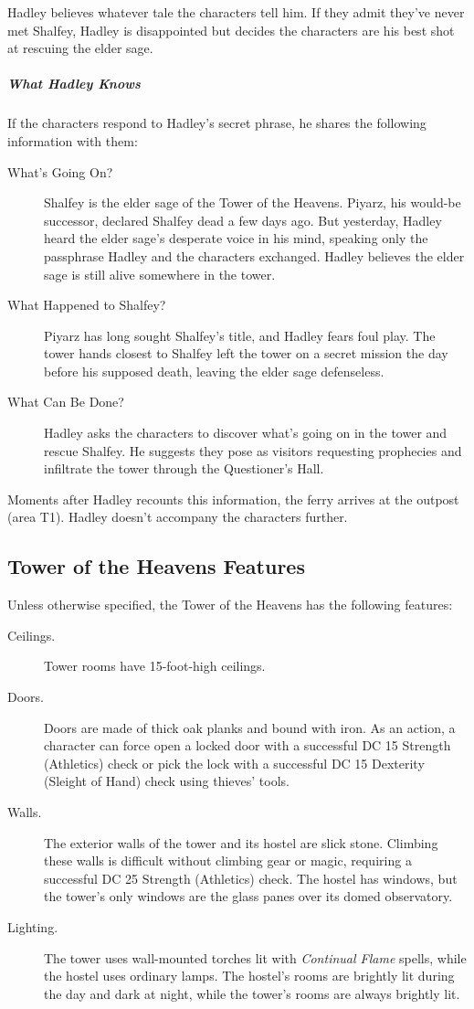 \documentclass[10pt,a4paper,twoside,bg=print,twocolumn,openany,nodeprecatedcode]{dndbook}
\begin{document}
Hadley believes whatever tale the characters tell him. If they admit they've never met Shalfey, Hadley is disappointed but decides the characters are his best shot at rescuing the elder sage.

\subparagraph{What Hadley Knows}
If the characters respond to Hadley's secret phrase, he shares the following information with them:


\begin{description}
\item[What's Going On?]
Shalfey is the elder sage of the Tower of the Heavens. Piyarz, his would-be successor, declared Shalfey dead a few days ago. But yesterday, Hadley heard the elder sage's desperate voice in his mind, speaking only the passphrase Hadley and the characters exchanged. Hadley believes the elder sage is still alive somewhere in the tower.
\item[What Happened to Shalfey?]
Piyarz has long sought Shalfey's title, and Hadley fears foul play. The tower hands closest to Shalfey left the tower on a secret mission the day before his supposed death, leaving the elder sage defenseless.
\item[What Can Be Done?]
Hadley asks the characters to discover what's going on in the tower and rescue Shalfey. He suggests they pose as visitors requesting prophecies and infiltrate the tower through the Questioner's Hall.
\end{description}

Moments after Hadley recounts this information, the ferry arrives at the outpost (area T1). Hadley doesn't accompany the characters further.

\subsection{Tower of the Heavens Features}
Unless otherwise specified, the Tower of the Heavens has the following features:


\begin{description}
\item[Ceilings.]
Tower rooms have 15-foot-high ceilings.
\item[Doors.]
Doors are made of thick oak planks and bound with iron. As an action, a character can force open a locked door with a successful DC 15 Strength (Athletics) check or pick the lock with a successful DC 15 Dexterity (Sleight of Hand) check using thieves' tools.
\item[Walls.]
The exterior walls of the tower and its hostel are slick stone. Climbing these walls is difficult without climbing gear or magic, requiring a successful DC 25 Strength (Athletics) check. The hostel has windows, but the tower's only windows are the glass panes over its domed observatory.
\item[Lighting.]
The tower uses wall-mounted torches lit with \textit{Continual Flame} spells, while the hostel uses ordinary lamps. The hostel's rooms are brightly lit during the day and dark at night, while the tower's rooms are always brightly lit.
\end{description}
\end{document}
